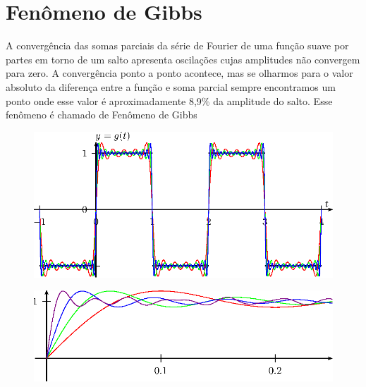 \section{Fenômeno de Gibbs}
A convergência das somas parciais da série de Fourier de uma função suave por partes em torno de um salto apresenta oscilações cujas amplitudes não convergem para zero. A convergência ponto a ponto acontece, mas se olharmos para o valor absoluto da diferença entre a função e soma parcial sempre encontramos um ponto onde esse valor é aproximadamente 8,9\% da amplitude do salto. Esse fenômeno é chamado de Fenômeno de Gibbs
\begin{figure}[!ht]
\begin{center}
\includegraphics[width=\textwidth]{cap_propriedades_series/pics/figura_2}\end{center}
\end{figure}
\begin{figure}[!ht]
\begin{center}
\includegraphics[width=\textwidth]{cap_propriedades_series/pics/figura_3}\end{center}
\end{figure}
